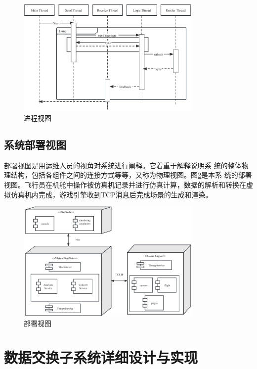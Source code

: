 \begin{figure}[h]
    \begin{center}
        \includegraphics[width=0.8\textwidth]{pictures/procedure.pdf}
        \caption{进程视图}
        \label{procedure}
    \end{center} 
\end{figure}
\subsection{系统部署视图}
部署视图是用运维人员的视角对系统进行阐释。它着重于解释说明系
统的整体物理结构，包括各组件之间的连接方式等等，又称为物理视图。图\ref{deploydiagram}是本系
统的部署视图。飞行员在机舱中操作被仿真机记录并进行仿真计算，数据的解析和转换在虚拟仿真机内完成，游戏引擎收到TCP消息后完成场景的生成和渲染。
\begin{figure}[h]
    \begin{center}
        \includegraphics[width=0.8\textwidth]{pictures/deploydiagram.pdf}
        \caption{部署视图}
        \label{deploydiagram}
    \end{center}
\end{figure}
\section{数据交换子系统详细设计与实现}






